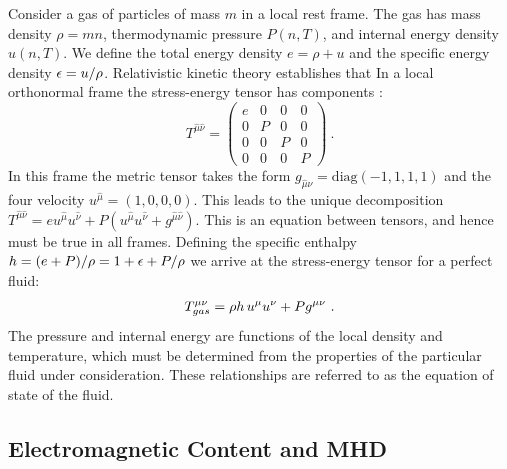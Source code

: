   Consider a gas of particles of mass $m$ in a local rest frame. The gas has mass density $\rho = m n$, thermodynamic pressure $P(n,T)$, and internal energy density $u(n,T)$.  We define the total energy density $e = \rho + u$ and the specific energy density $\epsilon = u / \rho$.  Relativistic kinetic theory establishes that In a local orthonormal frame the stress-energy tensor has components \citep{RezzollaZanotti}:
  \begin{equation}
  	T^{\hat{\mu}\hat{\nu}} = \begin{pmatrix} e & 0 & 0 & 0 \\
									0 & P & 0 & 0 \\
									0 & 0 & P & 0 \\
									0 & 0 & 0 & P \end{pmatrix}\ .
  \end{equation}
In this frame the metric tensor takes the form $g_{\hat{\mu}\hat{\nu}} = \text{diag}(-1,1,1,1)$ and the four velocity $u^{\hat{\mu}}  = (1,0,0,0)$.  This leads to the unique decomposition $T^{\hat{\mu}\hat{\nu}} = e u^{\hat{\mu}}u^{\hat{\nu}} + P ( u^{\hat{\mu}}u^{\hat{\nu}} + g^{\hat{\mu}\hat{\nu}})$.  This is an equation between tensors, and hence must be true in all frames. Defining the specific enthalpy $h = (e+P)/\rho = 1 + \epsilon + P/\rho$ we arrive at the stress-energy tensor for a perfect fluid:
\begin{equation}
	T^{\mu\nu}_{gas} = \rho h \ \! u^\mu u^\nu + P g^{\mu\nu} \eqlabel{defTgas}\ .
\end{equation}
The pressure and internal energy are functions of the local density and temperature, which must be determined from the properties of the particular fluid under consideration.  These relationships are referred to as the equation of state of the fluid.

\subsection{Electromagnetic Content and MHD}

